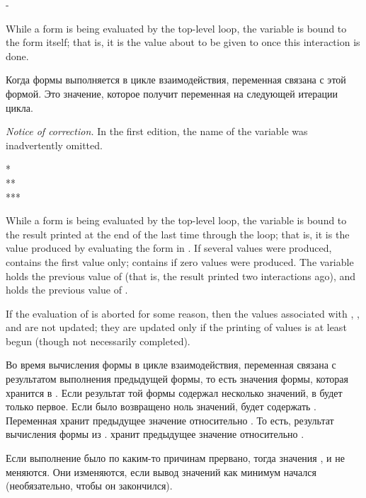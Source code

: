 \begin{defun}[Variable]
-

While a form is being evaluated by the top-level loop,
the variable \cdf{-} is bound to the form itself; that is,
it is the value about to be given to \cdf{+} once this interaction
is done.

Когда формы выполняется в цикле взаимодействия, переменная \cdf{-} связана с
этой формой. Это значение, которое получит переменная \cdf{+} на следующей
итерации цикла.
\begin{new}%
\emph{Notice of correction.}
In the first edition, the name of the variable \cdf{-} was
inadvertently omitted.
\end{new}

\end{defun}

\begin{defun}[Variable]
* \\
** \\
***

While a form is being evaluated by the top-level loop,
the variable \cdf{*} is bound to the result printed at the
end of the last time through the loop; that is, it is the value
produced by evaluating the form in \cdf{+}.  If several values were produced,
\cdf{*} contains the first value only; \cdf{*} contains {\nil} if zero values
were produced.
The variable \cdf{**} holds the previous value of \cdf{*} (that is, the result
printed two interactions ago), and \cdf{***} holds the previous value
of \cdf{**}.

If the evaluation of \cdf{+} is aborted for some reason,
then the values associated with \cdf{*}, \cdf{**}, and \cdf{***} are not updated;
they are updated only if the printing of values is at least begun (though not
necessarily completed).

Во время вычисления формы в цикле взаимодействия, переменная \cdf{*} связана с
результатом выполнения предыдущей формы, то есть значения формы, которая
хранится в \cdf{+}.
Если результат той формы содержал несколько значений, в \cdf{*} будет только
первое. Если было возвращено ноль значений, \cdf{*} будет содержать {\nil}.
Переменная \cdf{**} хранит предыдущее значение относительно \cdf{*}. То есть,
результат вычисления формы из \cdf{**}. \cdf{***} хранит предыдущее значение
относительно \cdf{***}.

Если выполнение \cdf{+} было по каким-то причинам прервано, тогда значения
\cdf{*}, \cdf{**} и \cdf{***} не меняются.
Они изменяются, если вывод значений как минимум начался (необязательно, чтобы он
закончился).
\end{defun}

